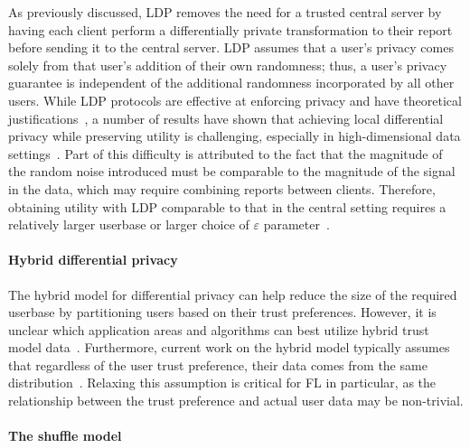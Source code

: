 \documentclass[11pt]{article}
\begin{document}
As previously discussed, LDP removes the need for a trusted central server by having each client perform a differentially private transformation to their report before sending it to the central server. LDP assumes that a user's privacy comes solely from that user's addition of their own randomness; thus, a user's privacy guarantee is independent of the additional randomness incorporated by all other users.
While LDP protocols are effective at enforcing privacy and have theoretical justifications~\cite{rappor:15, applewhitepaper:17,  collecting-telemetry-data-privately}, a number of results have shown that achieving local differential privacy while preserving utility is challenging, especially in high-dimensional data settings~\cite{KLNRS11,Ullman18,kairouz2014extremal, bassily2017practical, kairouz2016discrete, ye2018optimal,duchi2013local, cormode2018marginal}.
Part of this difficulty is attributed to the fact that the magnitude of the random noise introduced must be comparable to the magnitude of the signal in the data, which may require combining reports between clients. Therefore, obtaining utility with LDP comparable to that in the central setting requires a relatively larger userbase or larger choice of $\varepsilon$ parameter~\cite{appleepsilon}.

\paragraph{Hybrid differential privacy} 

The hybrid model for differential privacy can help reduce the size of the required userbase by partitioning users based on their trust preferences. However, it is unclear which application areas and algorithms can best utilize hybrid trust model data~\cite{avent2017blender}. Furthermore, current work on the hybrid model typically assumes that regardless of the user trust preference, their data comes from the same distribution~\cite{avent2017blender, dubey2018hybrid, beimel2019power}. Relaxing this assumption is critical for FL in particular, as the relationship between the trust preference and actual user data may be non-trivial.

\paragraph{The shuffle model} 
\end{document}
